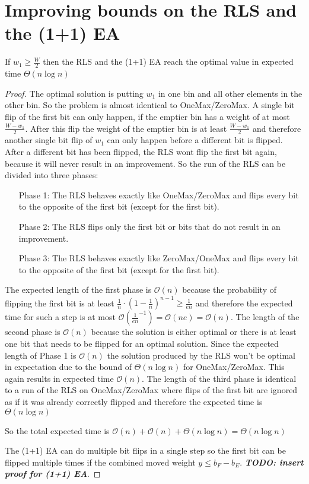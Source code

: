 \section{Improving bounds on the RLS and the (1+1) EA}
\begin{lemma}\label{OneMaxResult}
    If $w_1 \ge \frac W 2$  then the RLS and the (1+1) EA reach the optimal value in expected time $\Theta(n\log{}n)$
\end{lemma}
\begin{proof}
    The optimal solution is putting $w_1$ in one bin and all other elements in the other bin. So the problem is almost identical to OneMax/ZeroMax. A single bit flip of the first bit can only happen, if the emptier bin has a weight of at most $\frac {W-w_1}{2}$. After this flip the weight of the emptier bin is at least $\frac {W-w_1}{2}$ and therefore another single bit flip of $w_1$ can only happen before a different bit is flipped. After a different bit has been flipped, the RLS wont flip the first bit again, because it will never result in an improvement. So the run of the RLS can be divided into three phases:
    \begin{itemize}
        \item[Phase 1:] The RLS behaves exactly like OneMax/ZeroMax and flips every bit to the opposite of the first bit (except for the first bit).
        \item[Phase 2:] The RLS flips only the first bit or bits that do not result in an improvement.
        \item[Phase 3:] The RLS behaves exactly like ZeroMax/OneMax and flips every bit to the opposite of the first bit (except for the first bit).
    \end{itemize}

    The expected length of the first phase is $\mathcal{O}(n)$ because the probability of flipping the first bit is at least ${\frac{1}{n}} \cdot {(1 - \frac{1}{n})}^{n-1} \ge \frac{1}{en}$ and therefore the expected time for such a step is at most $\mathcal{O}(\frac{1}{en}^{-1}) = \mathcal{O}(ne) = \mathcal{O}(n)$.\newline
    The length of the second phase is $\mathcal{O}(n)$ because the solution is either optimal or there is at least one bit that needs to be flipped for an optimal solution. Since the expected length of Phase 1 is $\mathcal{O}(n)$ the solution produced by the RLS won't be optimal in expectation due to the bound of $\Theta(n\log{}n)$ for OneMax/ZeroMax. This again results in expected time $\mathcal{O}(n)$.\newline
    The length of the third phase is identical to a run of the RLS on OneMax/ZeroMax where flips of the first bit are ignored as if it was already correctly flipped and therefore the expected time is $\Theta(n\log{}n)$

    So the total expected time is $\mathcal{O}(n) + \mathcal{O}(n) + \Theta(n\log{}n) = \Theta(n\log{}n)$

    The (1+1) EA can do multiple bit flips in a single step so the first bit can be flipped multiple times if the combined moved weight \(y \le b_F-b_E\). \textbf{\textit{TODO: insert proof for (1+1) EA}}.
\end{proof}

